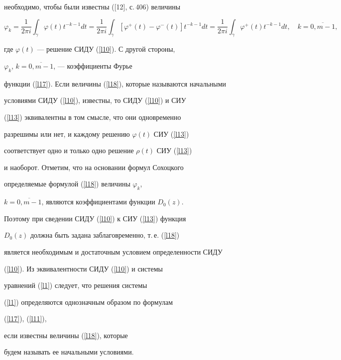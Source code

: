необходимо, чтобы были известны ([12], с.\,406) величины


\begin{equation}


\label{l18}


\varphi_k=\frac{1}{2\pi i} \int_\gamma \varphi(t)t^{-k-1}dt=


\frac{1}{2\pi i} \int_\gamma [\varphi^+(t)-\varphi^-(t)]t^{-k-1}dt= 


%


\frac{1}{2\pi i} \int_\gamma \varphi^+(t)t^{-k-1}dt, \quad k=\overline{0,m-1},


\end{equation}


где $\varphi(t)$ --- решение СИДУ (\ref{l10}). С другой стороны,


$\varphi_k$, $k=\overline{0,m-1}$, --- коэффициенты Фурье


функции (\ref{l17}). Если величины (\ref{l18}), которые называются начальными


условиями СИДУ (\ref{l10}), известны, то СИДУ (\ref{l10}) и СИУ


(\ref{l13}) эквивалентны в том смысле, что они одновременно


разрешимы или нет, и каждому решению $\varphi(t)$ СИУ (\ref{l13})


соответствует одно и только одно решение $\rho(t)$ СИУ (\ref{l13})


и наоборот. Отметим, что на основании формул Сохоцкого


определяемые формулой (\ref{l18}) величины $\varphi_k$,


$k=\overline{0,m-1}$, являются коэффициентами функции $D_0(z)$.


Поэтому при сведении СИДУ (\ref{l10}) к СИУ (\ref{l13}) функция


$D_0(z)$ должна быть задана заблаговременно, т.\,е. (\ref{l18})


является необходимым и достаточным условием определенности СИДУ


(\ref{l10}). Из эквивалентности СИДУ (\ref{l10}) и системы


уравнений (\ref{l1}) следует, что решения системы


(\ref{l1}) определяются однозначным образом по формулам


(\ref{l17}), (\ref{l11}),


если известны величины (\ref{l18}), которые


будем называть ее начальными условиями.





